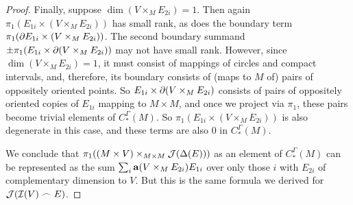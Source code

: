 \begin{proof}
Finally, suppose $\dim(V \times_M E_{2i}) = 1$. Then again $\pi_1(E_{1i} \times (V \times_M E_{2i}))$ has small rank, as does the boundary term $\pi_1(\partial E_{1i} \times (V \times_M E_{2i}))$. The second boundary summand $\pm\pi_1(E_{1i} \times \partial(V \times_M E_{2i}))$ may not have small rank. However, since $\dim(V \times_M E_{2i}) = 1$, it must consist of mappings of circles and compact intervals, and, therefore, its boundary consists of (maps to $M$ of) pairs of oppositely oriented points. So $E_{1i} \times \partial(V \times_M E_{2i})$ consists of pairs of oppositely oriented copies of $E_{1i}$ mapping to $M \times M$, and once we project via $\pi_1$, these pairs become trivial elements of $C^\Gamma_*(M)$. So $\pi_1(E_{1i} \times (V \times_M E_{2i}))$ is also degenerate in this case, and these terms are also $0$ in $C^\Gamma_*(M)$.

\begin{comment}

 We also have
$$\bd ( V \times_M E_{2i}) = \pm (\bd V) \times_M E_{2i}\pm V \times_M \bd E_{2i}$$.
Since $V$ is a cocycle, $\bd V$ is a union of trivial or small rank precochains, and hence so is $(\bd V) \times_M E_{2i}$ by Lemma \ref{L: pullback with Q}. If $\dim( V \times_M \bd E_{2i})>0$, then $\pi(V \times_M \bd E_{2i})$ has small rank. Finally, suppose $\dim (V \times_M \bd E_{2i}) = 0$. Then $\dim(V \times_M E_{2i}) = 1$. So $V \times_M E_{2i}$ consists of some number of circles and closed intervals in $E_{2i}$, and $V \times_M \bd E_{2i}$ will be the endpoints of those intervals. Since these must occur in pairs of opposite signs, then $E_{1i} \times (V \times_M \bd E_{2i})$ will consist of chains $\pm E_{1i} \times pt$, with the points being the points of $V \times_M \bd E_{2i}$. Since the points occur in oppositely signed pairs, under $\pi_1$ these pairs become trivial in $M$. Altogether then $\pi_1(\bd ( V \times_M E_{2i}))$ is a disjoint union of trivial and small rank precochains. So $V \times_M E_{2i} \in Q_*(M)$.
\end{comment}


We conclude that $\pi_1( (M \times V)\times_{M \times M}\mathcal{J}(\Delta(E)))$ as an element of $C_*^\Gamma(M)$ can be represented as the sum $\sum_i \mathbf{a}(V \times_M E_{2i})E_{1i}$ over only those $i$ with $E_{2i}$ of complementary dimension to $V$. But this is the same formula we derived for $\mathcal{J}(\mathcal{I}(V)\frown E)$.
\end{proof}






